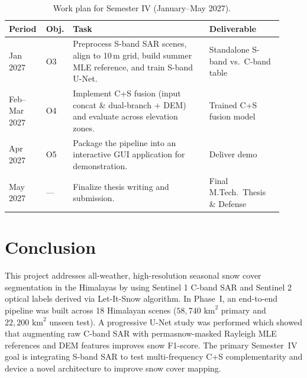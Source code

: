 \documentclass{article}
\newif\ifshowguide
\newcommand{\guide}[1]{%
  \ifshowguide
    \par\medskip\noindent
    \fcolorbox{blue!50}{blue!4}{%
      \begin{minipage}{\dimexpr\linewidth-2\fboxsep-2\fboxrule\relax}
        \small\color{blue!55!black}\textbf{Guidance.} #1
      \end{minipage}}%
    \par\medskip
  \fi}
\begin{document}
\begin{table}[!htb]
  \vspace{-4pt}
  \caption{Work plan for Semester IV (January--May 2027).}
  \label{tab:plan}
  \centering
  \footnotesize
  \setlength{\tabcolsep}{3.5pt}
  \renewcommand{\arraystretch}{0.80}
  \begin{tabular}{p{0.13\linewidth}p{0.05\linewidth}p{0.48\linewidth}p{0.26\linewidth}}
    \toprule
    Period & Obj. & Task & Deliverable \\
    \midrule
    Jan 2027      & O3 & Preprocess S-band SAR scenes, align to 10\,m grid, build summer MLE reference, and train S-band U-Net. & Standalone S-band vs.\ C-band table \\
    Feb--Mar 2027 & O4 & Implement C+S fusion (input concat \& dual-branch + DEM) and evaluate across elevation zones. & Trained C+S fusion model\\
    Apr 2027      & O5 & Package the pipeline into an interactive GUI application for demonstration. & Deliver demo \\
    May 2027      & --- & Finalize thesis writing and submission. & Final M.Tech.\ Thesis \& Defense \\
    \bottomrule
  \end{tabular}
\end{table}

\section{Conclusion}
\label{sec:conclusion}

\guide{One paragraph. Restate the problem, what Phase~I has established, and the
single most important goal for Semester IV. No new information here.}

This project addresses all-weather, high-resolution seasonal snow cover segmentation in the Himalayas by using Sentinel 1 C-band SAR and Sentinel 2 optical labels derived via Let-It-Snow algorithm. In Phase~I, an end-to-end pipeline was built across 18 Himalayan scenes ($58{,}740\text{ km}^2$ primary and $22{,}200\text{ km}^2$ unseen test). A progressive U-Net study was performed which showed that augmenting raw C-band SAR with permasnow-masked Rayleigh MLE references and DEM features improves snow F1-score. The primary Semester~IV goal is integrating S-band SAR to test multi-frequency C+S complementarity and device a novel architecture to improve snow cover mapping.
\end{document}
